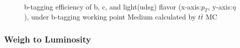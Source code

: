 			\begin{figure}[H]
			\centering
			    \\
			   \caption{b-tagging efficiency of b, c, and light(udsg) flavor (x-axis:$p_T$, y-axis:$\eta$), under b-tagging working point Medium calculated by $t\bar{t}$ MC}
			\label{DataMC:fig:tt_eff_btag}
			\end{figure}
			\FloatBarrier

		\subsubsection{Weigh to Luminosity}
		\label{sssec:DataAndMC_lumi}





